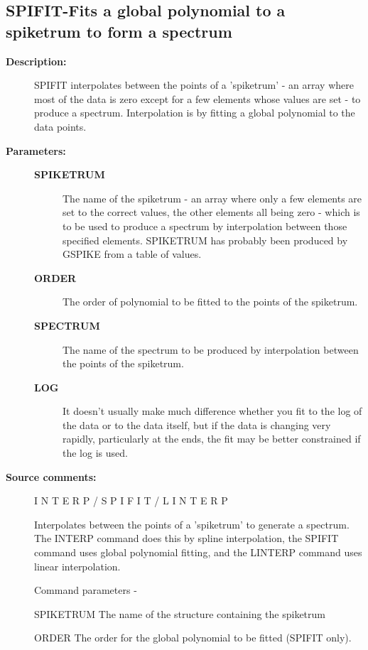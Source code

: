 \subsection{SPIFIT-\label{SPIFIT}Fits a global polynomial to a spiketrum to form a spectrum}
\begin{description}

\item [\textbf{Description:}]
 SPIFIT interpolates between the points of a 'spiketrum' - an
 array where most of the data is zero except for a few elements
 whose values are set - to produce a spectrum.  Interpolation is
 by fitting a global polynomial to the data points.

\item [\textbf{Parameters:}]
\begin{description}
\item [\textbf{SPIKETRUM}]
 The name of the spiketrum - an array where
 only a few elements are set to the correct values, the
 other elements all being zero - which is to be used to
 produce a spectrum by interpolation between those specified
 elements.  SPIKETRUM has probably been produced by GSPIKE
 from a table of values.
\item [\textbf{ORDER}]
 The order of polynomial to be fitted to the
 points of the spiketrum.
\item [\textbf{SPECTRUM}]
 The name of the spectrum to be produced by
 interpolation between the points of the spiketrum.
\item [\textbf{LOG}]
 It doesn't usually make much difference whether you fit
 to the log of the data or to the data itself, but if the
 data is changing very rapidly, particularly at the ends,
 the fit may be better constrained if the log is used.
\end{description}

\item [\textbf{Source comments:}]
\begin{terminalv}
 I N T E R P    /     S P I F I T    /   L I N T E R P

 Interpolates between the points of a 'spiketrum' to
 generate a spectrum.   The INTERP command does this by
 spline interpolation, the SPIFIT command uses global polynomial
 fitting, and the LINTERP command uses linear interpolation.

 Command parameters -

 SPIKETRUM  The name of the structure containing the spiketrum

 ORDER      The order for the global polynomial to be fitted
            (SPIFIT only).


\end{terminalv}
\end{description}
